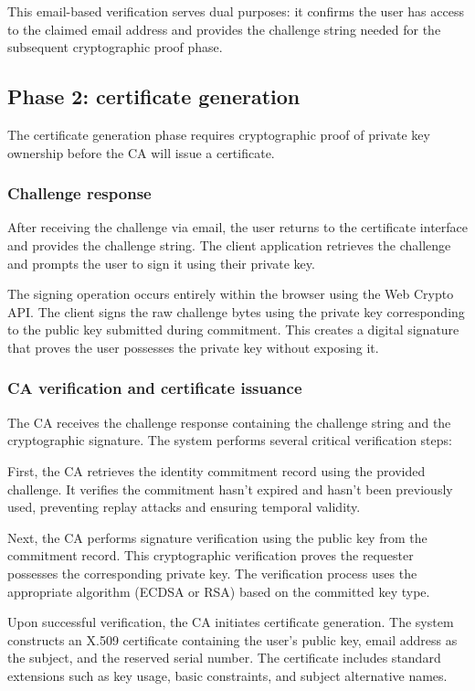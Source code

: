 This email-based verification serves dual purposes: it confirms the user has 
access to the claimed email address and provides the challenge string needed 
for the subsequent cryptographic proof phase.

\subsection{Phase 2: certificate generation}

The certificate generation phase requires cryptographic proof of private key 
ownership before the CA will issue a certificate.

\subsubsection{Challenge response}

After receiving the challenge via email, the user returns to the certificate 
interface and provides the challenge string. The client application retrieves 
the challenge and prompts the user to sign it using their private key.

The signing operation occurs entirely within the browser using the Web Crypto API. 
The client signs the raw challenge bytes using the private key corresponding to 
the public key submitted during commitment. This creates a digital signature 
that proves the user possesses the private key without exposing it.

\subsubsection{CA verification and certificate issuance}

The CA receives the challenge response containing the challenge string and the 
cryptographic signature. The system performs several critical verification steps:

First, the CA retrieves the identity commitment record using the provided challenge. 
It verifies the commitment hasn't expired and hasn't been previously used, 
preventing replay attacks and ensuring temporal validity.

Next, the CA performs signature verification using the public key from the 
commitment record. This cryptographic verification proves the requester possesses 
the corresponding private key. The verification process uses the appropriate 
algorithm (ECDSA or RSA) based on the committed key type.

Upon successful verification, the CA initiates certificate generation. The system 
constructs an X.509 certificate containing the user's public key, email address 
as the subject, and the reserved serial number. The certificate includes standard 
extensions such as key usage, basic constraints, and subject alternative names.

